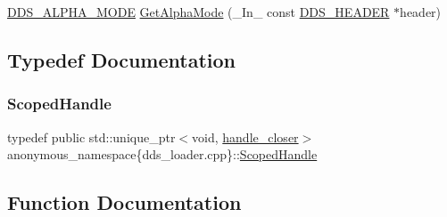 \begin{DoxyCompactItemize}
\item 
\mbox{\hyperlink{namespace_direct_x_a7cb48689d75471680c0bf7f79caaaf1f}{D\+D\+S\+\_\+\+A\+L\+P\+H\+A\+\_\+\+M\+O\+DE}} \mbox{\hyperlink{namespaceanonymous__namespace_02dds__loader_8cpp_03_acd06d26c6b5121b02a055280b53fbf46}{Get\+Alpha\+Mode}} (\+\_\+\+In\+\_\+ const \mbox{\hyperlink{struct_d_d_s___h_e_a_d_e_r}{D\+D\+S\+\_\+\+H\+E\+A\+D\+ER}} $\ast$header)
\end{DoxyCompactItemize}


\subsection{Typedef Documentation}
\mbox{\label{namespaceanonymous__namespace_02dds__loader_8cpp_03_a9d9d95d4fe1f262059ad87b68d4eef46}} 
\subsubsection{\texorpdfstring{Scoped\+Handle}{ScopedHandle}}
{\footnotesize\ttfamily typedef public std\+::unique\+\_\+ptr$<$void, \mbox{\hyperlink{structanonymous__namespace_02dds__loader_8cpp_03_1_1handle__closer}{handle\+\_\+closer}}$>$ anonymous\+\_\+namespace\{dds\+\_\+loader.\+cpp\}\+::\mbox{\hyperlink{namespaceanonymous__namespace_02dds__loader_8cpp_03_a9d9d95d4fe1f262059ad87b68d4eef46}{Scoped\+Handle}}}



\subsection{Function Documentation}
\mbox{\label{namespaceanonymous__namespace_02dds__loader_8cpp_03_a2d6a6e62ba91c25b8451e886ce17615b}} 
